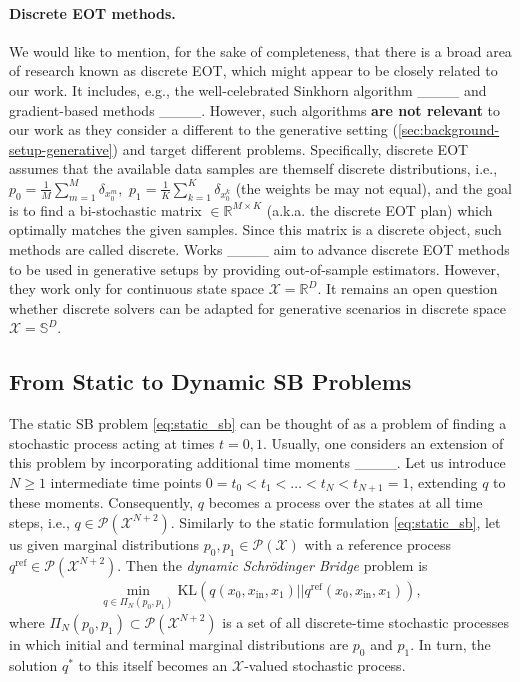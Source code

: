 \paragraph{Discrete EOT methods.} We would like to mention, for the sake of completeness, that there is a broad area of research known as discrete EOT, which might appear to be closely related to our work. It includes, e.g., the well-celebrated Sinkhorn algorithm ____ and gradient-based methods ____. However, such algorithms \textbf{are not relevant} to our work as they consider a different to the generative setting (\wasyparagraph\ref{sec:background-setup-generative}) and target different problems. Specifically, discrete EOT assumes that the available data samples are themself discrete distributions, i.e., $p_0 =\frac{1}{M}\sum^M_{m=1}\delta_{x_0^m},$ $p_1 = \frac{1}{K}\sum^K_{k=1}\delta_{x^k_0}$ (the weights be may not equal), and the goal is to find a bi-stochastic matrix $\in\mathbb{R}^{M\times K}$ (a.k.a. the discrete EOT plan) which optimally matches the given samples. Since this matrix is a discrete object, such methods are called discrete. Works ____ aim to advance discrete EOT methods to be used in generative setups by providing out-of-sample estimators. However, they work only for continuous state space $\mathcal{X}=\mathbb{R}^{D}$. It remains an open question whether discrete solvers can be adapted for generative scenarios in discrete space $\mathcal{X}=\mathbb{S}^{D}$.

\subsection{From Static to Dynamic SB Problems}
The static SB problem \eqref{eq:static_sb} can be thought of as a problem of finding a stochastic process acting at times $t=0,1$. Usually, one considers an extension of this problem by incorporating additional time moments ____. Let us introduce $N \geq 1$ intermediate time points $0 = t_0 < t_1 < \dots < t_N < t_{N+1} = 1$, extending $q$ to these moments. Consequently, $q$ becomes a process over the states at all time steps, i.e., $q \in \mathcal{P}(\mathcal{X}^{N+2})$. Similarly to the static formulation \eqref{eq:static_sb}, let us given marginal distributions $p_0,p_1 \in \mathcal{P}(\mathcal{X})$ with a reference process $q^{\text{ref}}\in\mathcal{P}(\mathcal{X}^{N+2})$. Then the \emph{dynamic Schrödinger Bridge} problem is
\begin{multline}
    \label{eq:disc_dyn_sb}
    \min_{q \in \Pi_{N}(p_0, p_1)}\text{KL}(q(x_0, x_{\text{in}}, x_1)||q^{\text{ref}}(x_0, x_{\text{in}}, x_1)),
\end{multline}
where $\Pi_{N}(p_0, p_1) \subset \mathcal{P}(\mathcal{X}^{N+2})$ is a set of all discrete-time stochastic processes in which initial and terminal marginal distributions are $p_0$ and $p_1$. In turn, the solution $q^{*}$ to this itself becomes an $\mathcal{X}$-valued stochastic process.

